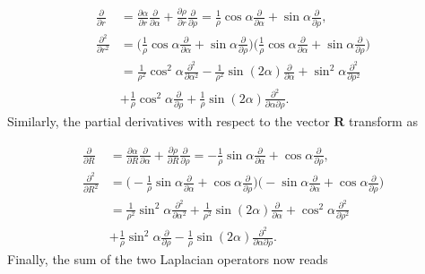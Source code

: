 \documentclass{article}
\numberwithin{equation}{section}
\numberwithin{figure}{section}
\begin{document}
\begin{align}
	\frac{\partial}{\partial r}        &= \frac{\partial\alpha}{\partial r} \frac{\partial}{\partial\alpha} +  \frac{\partial\rho}{\partial r} \frac{\partial}{\partial\rho} = \frac{1}{\rho}\cos{\alpha}\frac{\partial}{\partial \alpha} + \sin{\alpha}\frac{\partial}{\partial \rho}, \\
	\frac{\partial^2}{\partial r^2} &= \bigg( \frac{1}{\rho} \cos\alpha \frac{\partial}{\partial\alpha} + \sin\alpha \frac{\partial}{\partial\rho}\bigg) \bigg( \frac{1}{\rho} \cos\alpha \frac{\partial}{\partial\alpha} + \sin\alpha \frac{\partial}{\partial\rho}\bigg) \nonumber \\
	&= \frac{1}{\rho^2} \cos^2\alpha \frac{\partial^2}{\partial\alpha^{2}} - \frac{1}{\rho^2} \sin(2\alpha) \frac{\partial}{\partial\alpha} + \sin^2\alpha \frac{\partial^2}{\partial\rho^{2}} \nonumber \\
	&+ \frac{1}{\rho} \cos^2\alpha \frac{\partial}{\partial\rho} + \frac{1}{\rho} \sin(2\alpha) \frac{\partial^2}{\partial\alpha \partial\rho}.
\end{align}
Similarly, the partial derivatives with respect to the vector $\mathbf{R}$ transform as

\begin{align}
	\frac{\partial}{\partial R}        &= \frac{\partial\alpha}{\partial R} \frac{\partial}{\partial\alpha} +  \frac{\partial\rho}{\partial R} \frac{\partial}{\partial\rho} = -\frac{1}{\rho}\sin{\alpha}\frac{\partial}{\partial \alpha} + \cos{\alpha}\frac{\partial}{\partial \rho},  \\
	\frac{\partial^2}{\partial R^2}&= \bigg( -\frac{1}{\rho} \sin\alpha \frac{\partial}{\partial\alpha} + \cos\alpha \frac{\partial}{\partial\rho}\bigg)  \bigg( -  \sin\alpha \frac{\partial}{\partial\alpha} + \cos\alpha \frac{\partial}{\partial\rho}\bigg) \nonumber \\
	&= \frac{1}{\rho^2} \sin^2\alpha\frac{\partial^2}{\partial\alpha^{2}} + \frac{1}{\rho^2} \sin(2\alpha)\frac{\partial}{\partial\alpha} + \cos^2\alpha \frac{\partial^2}{\partial \rho^2} \nonumber \\
	&+\frac{1}{\rho}\sin^2\alpha\frac{\partial}{\partial \rho}- \frac{1}{\rho} \sin(2\alpha) \frac{\partial^2}{\partial\alpha \partial\rho}.
\end{align}
Finally, the sum of the two Laplacian operators now reads 
\end{document}
